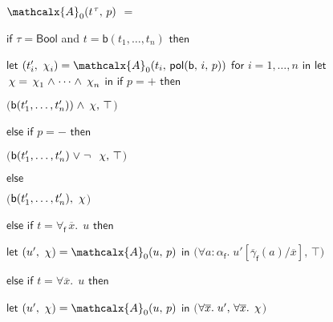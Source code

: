 \documentclass[runningheads,a4paper]{llncs}
\newcommand\return{}
\newcommand\bigtuple[1]{$\bigl(${#1}$\bigr)$}
\newcommand{\con}[1]{\mathsf{#1}}
\renewcommand\vec[1]{\overline{#1}}
\let\oldchi=\chi
\def\chi{{\vthinspace\oldchi}}
\let\oldneg=\neg
\def\neg{\oldneg\;}
\let\oldvee=\vee
\def\vee{\mathrel{\oldvee}}
\let\oldwedge=\wedge
\def\wedge{\mathrel{\oldwedge}}
\newcommand{\conv}{\mathcalx{A}}
\newcommand{\ppos}{{+}}
\newcommand{\pneg}{{-}}
\newcommand{\pol}{\con{pol}}
\newcommand\ty[1]{\con{#1}}
\newcommand{\Bool}{\ty{Bool}}
\newcommand{\ltrue}{\top}
\newcommand\concret{\gamma} %
\newcommand{\boolop}{\con{b}}
\newcommand{\forallf}[1]{\forall_{\!#1\:}}
\newcommand{\vecfarg}[1]{\vec{\concret}_{#1}}
\newcommand{\fargtype}[1]{\alpha_{#1}}
\newcommand{\vthinspace}{\kern+0.083333em}
\newcommand{\typ}[1]{^{\vthinspace #1}}
\begin{document}
\begin{figure}[t]
\normalsize
\begin{enumerate}
\itemx[\ ]
$\conv_0( t\typ{\tau},\, p )$ $=$
\\[-.8\baselineskip]
 \begin{itemize}
   \itemx[] $\mathsf{if}$ $\tau = \Bool$ and $t = \boolop(t_1,\ldots,t_n)$ $\mathsf{then}$
    \begin{itemize}
      \itemx[] $\mathsf{let}$ $( t'_i,\, \chi_i ) = \conv_0( t_i,\, \pol( \boolop,\, i,\, p ) )$ $\mathsf{for}$ $i = 1, \ldots, n$ $\mathsf{in}$%
      \itemx[] $\mathsf{let}$ $\chi = \chi_1 \wedge \cdots \wedge \chi_n$ $\mathsf{in}$
      \itemx[] $\mathsf{if}$ $p = \ppos$ $\mathsf{then}$
      \begin{itemize}
        \itemx[] \return \bigtuple{$\boolop(t'_1, \ldots, t'_n) ) \wedge \chi,\, \ltrue$}
      \end{itemize}
      \itemx[] $\mathsf{else}$ $\mathsf{if}$ $p = \pneg$ $\mathsf{then}$
      \begin{itemize}
        \itemx[] \return \bigtuple{$\boolop(t'_1, \ldots, t'_n) \vee \neg \chi,\, \ltrue$}
      \end{itemize}
      \itemx[] $\mathsf{else}$
      \begin{itemize}
        \itemx[] \return \bigtuple{$\boolop(t'_1, \ldots, t'_n),\, \chi$}
\\[-.8\baselineskip]
      \end{itemize}
    \end{itemize}
  \itemx[] $\mathsf{else}$ $\mathsf{if}$ $t = \forallf{\con{f}} \vec x.\;\, u$ $\mathsf{then}$
    \begin{itemize}
      \itemx[] $\mathsf{let}$ $( u',\, \chi ) = \conv_0( u,\, p )$ $\mathsf{in}$
      \itemx[] \return \bigtuple{$\forall a : \fargtype{\con{f}}.\; u' [ \vecfarg{\con{f}}( a ) / \vec x ],\, \ltrue$}
\\[-.8\baselineskip]
    \end{itemize}
  \itemx[] $\mathsf{else}$ $\mathsf{if}$ $t = \forall \vec x.\;\, u$ $\mathsf{then}$
    \begin{itemize}
      \itemx[] $\mathsf{let}$ $( u',\, \chi ) = \conv_0( u,\, p )$ $\mathsf{in}$
      \itemx[] \return \bigtuple{$\forall \vec x.\; u',\, \forall \vec x.\; \chi$}
\\[-.8\baselineskip]
    \end{itemize}

\end{itemize}
\end{enumerate}
\end{figure}
\end{document}
